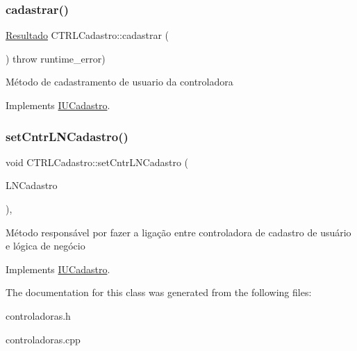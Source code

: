 \subsubsection{\texorpdfstring{cadastrar()}{cadastrar()}}
{\footnotesize\ttfamily \hyperlink{classResultado}{Resultado} C\+T\+R\+L\+Cadastro\+::cadastrar (\begin{DoxyParamCaption}{ }\end{DoxyParamCaption}) throw  runtime\+\_\+error) \hspace{0.3cm}{\ttfamily [virtual]}}

Método de cadastramento de usuario da controladora 

Implements \hyperlink{classIUCadastro}{I\+U\+Cadastro}.

\mbox{\label{classCTRLCadastro_aa9324e682be46537c44c2feb33e05991}} 
\subsubsection{\texorpdfstring{set\+Cntr\+L\+N\+Cadastro()}{setCntrLNCadastro()}}
{\footnotesize\ttfamily void C\+T\+R\+L\+Cadastro\+::set\+Cntr\+L\+N\+Cadastro (\begin{DoxyParamCaption}\item[{\hyperlink{classILNCadastro}{I\+L\+N\+Cadastro} $\ast$}]{L\+N\+Cadastro }\end{DoxyParamCaption})\hspace{0.3cm}{\ttfamily [inline]}, {\ttfamily [virtual]}}

Método responsável por fazer a ligação entre controladora de cadastro de usuário e lógica de negócio 

Implements \hyperlink{classIUCadastro}{I\+U\+Cadastro}.



The documentation for this class was generated from the following files\+:\begin{DoxyCompactItemize}
\item 
controladoras.\+h\item 
controladoras.\+cpp\end{DoxyCompactItemize}

